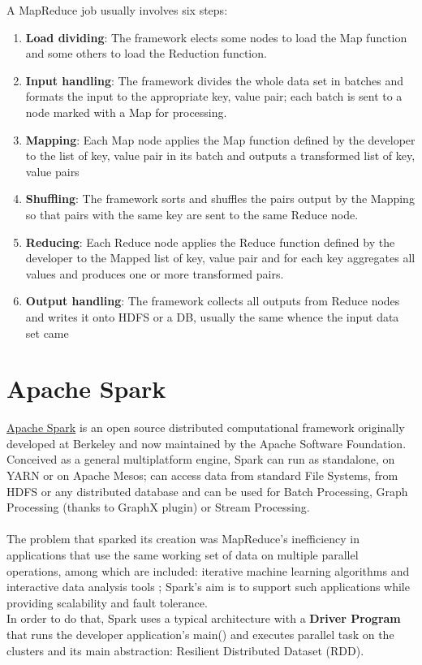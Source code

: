 A MapReduce job usually involves six steps:

\begin{enumerate}
	\item \textbf{Load dividing}: The framework elects some nodes to load the Map function and some others to load the Reduction function.
	\item \textbf{Input handling}: The framework divides the whole data set in batches and formats the input to the appropriate key, value pair; each batch is sent to a node marked with a Map for processing.
	\item \textbf{Mapping}: Each Map node applies the Map function defined by the developer to the list of key, value pair in its batch and outputs a transformed list of key, value pairs
	\item \textbf{Shuffling}: The framework sorts and shuffles the pairs output by the Mapping so that pairs with the same key are sent to the same Reduce node.
	\item \textbf{Reducing}: Each Reduce node applies the Reduce function defined by the developer to the Mapped list of key, value pair and for each key aggregates all values and produces one or more transformed pairs.
	\item \textbf{Output handling}: The framework collects all outputs from Reduce nodes and writes it onto HDFS or a DB, usually the same whence the input data set came
\end{enumerate}

 \pagebreak
 
\section{Apache Spark} \label{Spark}

\href{https://spark.apache.org/}{Apache Spark} is an open source distributed computational framework originally developed at Berkeley and now maintained by the Apache Software Foundation.
\\
Conceived as a general multiplatform engine, Spark can run as standalone, on YARN or on Apache Mesos; can access data from standard File Systems, from HDFS or any distributed database and can be used for Batch Processing, Graph Processing (thanks to GraphX plugin) or Stream Processing.
\\
\\
The problem that sparked its creation was MapReduce's inefficiency in applications that use the same working set of data on multiple parallel operations, among which are included: iterative machine learning algorithms and interactive data analysis tools \cite{Zaharia:2010:SCC:1863103.1863113}; Spark's aim is to support such applications while providing scalability and fault tolerance.
\\
In order to do that, Spark uses a typical architecture with a \textbf{Driver Program} that runs the developer application's main() and executes parallel task on the clusters and its main abstraction: Resilient Distributed Dataset (RDD).

